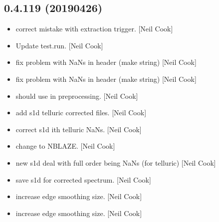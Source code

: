 \documentclass[a4paper,10pt,english]{report}
\begin{document}
\subsection{0.4.119 (2019\sphinxhyphen{}04\sphinxhyphen{}26)}
\label{\detokenize{misc/changelog:id160}}\begin{itemize}
\item {} 
 \sphinxhyphen{} correct mistake with extraction trigger. {[}Neil
Cook{]}

\item {} 
Update test.run. {[}Neil Cook{]}

\item {} 
 \sphinxhyphen{} fix problem with NaNs in header (make string) {[}Neil
Cook{]}

\item {} 
 \sphinxhyphen{} fix problem with NaNs in header (make string) {[}Neil
Cook{]}

\item {} 
 \sphinxhyphen{} should use  in preprocessing. {[}Neil
Cook{]}

\item {} 
 \sphinxhyphen{} add s1d telluric corrected files. {[}Neil Cook{]}

\item {} 
 \sphinxhyphen{} correct s1d ith telluric NaNs. {[}Neil Cook{]}

\item {} 
 \sphinxhyphen{} change to NBLAZE. {[}Neil Cook{]}

\item {} 
 \sphinxhyphen{} new s1d \sphinxhyphen{} deal with full order being NaNs (for
telluric) {[}Neil Cook{]}

\item {} 
 \sphinxhyphen{} save s1d for corrected spectrum. {[}Neil Cook{]}

\item {} 
 \sphinxhyphen{} increase edge smoothing size. {[}Neil Cook{]}

\item {} 
 \sphinxhyphen{} increase edge smoothing size. {[}Neil Cook{]}


\end{itemize}
\end{document}
